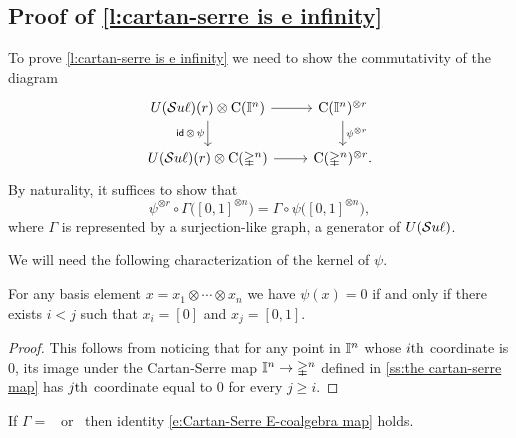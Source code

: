 
\subsection{Proof of \cref{l:cartan-serre is e infinity}} \label{ss:comparison proof}

To prove \cref{l:cartan-serre is e infinity} we need to show the commutativity of the diagram
\begin{equation*}
\begin{tikzcd}
U(\Sl)(r) \otimes \gchains(\gcube^n) \arrow[r] \arrow[d, "\id\, \otimes\, \psi"'] &
\gchains(\gcube^n)^{\otimes r} \arrow[d, "\psi^{\otimes r}"] \\
U(\Sl)(r) \otimes \gchains(\gsimplex^n) \arrow[r] &
\gchains(\gsimplex^n)^{\otimes r}.
\end{tikzcd}
\end{equation*}
By naturality, it suffices to show that
\begin{equation} \label{e:Cartan-Serre E-coalgebra map}
\psi^{\otimes r} \circ \Gamma\big( [0,1]^{\otimes n} \big) = \Gamma \circ \psi \big( [0,1]^{\otimes n} \big),
\end{equation}
where $\Gamma$ is represented by a surjection-like graph, a generator of $U(\mathcal{S}u\ell)$.

We will need the following characterization of the kernel of $\psi$.
\begin{lemma} \label{l:kernel of psi}
	For any basis element $x = x_1 \otimes \cdots \otimes x_n$ we have $\psi(x) = 0$ if and only if there exists $i < j$ such that $x_i = [0]$ and $x_j = [0,1]$. 
\end{lemma}

\begin{proof}
	This follows from noticing that for any point in $\mathbb{I}^n$ whose $i\mathrm{th}$ coordinate is $0$, its image under the Cartan-Serre map $\mathbb{I}^n \to \mathbb{\Delta}^n$ defined in \cref{ss:the cartan-serre map} has $j\mathrm{th}$ coordinate equal to $0$ for every $j \geq i$.
\end{proof}

\begin{lemma}
	If $\Gamma =$ \counit \ or \coproduct \ then identity \eqref{e:Cartan-Serre E-coalgebra map} holds.
\end{lemma}

